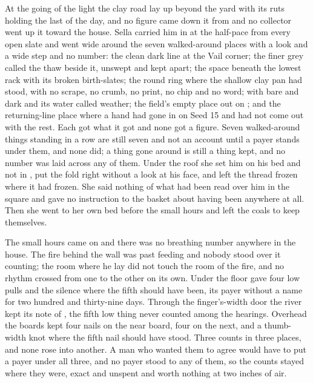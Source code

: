 \scenebreak

At the going of the light the clay road lay up beyond the yard with its ruts holding the last of the day, and no figure came down it from  and no collector went up it toward the house. Sella carried him in at the half-pace from every open slate and went wide around the seven walked-around places with a look and a wide step and no number: the clean dark line at the Vail corner; the finer grey called the thaw beside it, unswept and kept apart; the space beneath the lowest rack with its broken birth-slates; the round ring where the shallow clay pan had stood, with no scrape, no crumb, no print, no chip and no word;  with  bare and dark and its water called weather; the field's empty place out on ; and the returning-line place where a hand had gone in on Seed 15 and had not come out with the rest. Each got what it got and none got a figure. Seven walked-around things standing in a row are still seven and not an account until a payer stands under them, and none did; a thing gone around is still a thing kept, and no number was laid across any of them. Under the roof she set him on his bed and not in , put the fold right without a look at his face, and left the thread frozen where it had frozen. She said nothing of what had been read over him in the square and gave no instruction to the basket about having been anywhere at all. Then she went to her own bed before the small hours and left the coals to keep themselves.

The small hours came on and there was no breathing number anywhere in the house. The fire behind the wall was past feeding and nobody stood over it counting; the room where he lay did not touch the room of the fire, and no rhythm crossed from one to the other on its own. Under the floor  gave four low pulls and the silence where the fifth should have been, its payer without a name for two hundred and thirty-nine days. Through the finger's-width door the river kept its note of , the fifth low thing never counted among the hearings. Overhead the boards kept four nails on the near board, four on the next, and a thumb-width knot where the fifth nail should have stood. Three counts in three places, and none rose into another. A man who wanted them to agree would have to put a payer under all three, and no payer stood to any of them, so the counts stayed where they were, exact and unspent and worth nothing at two inches of air.

